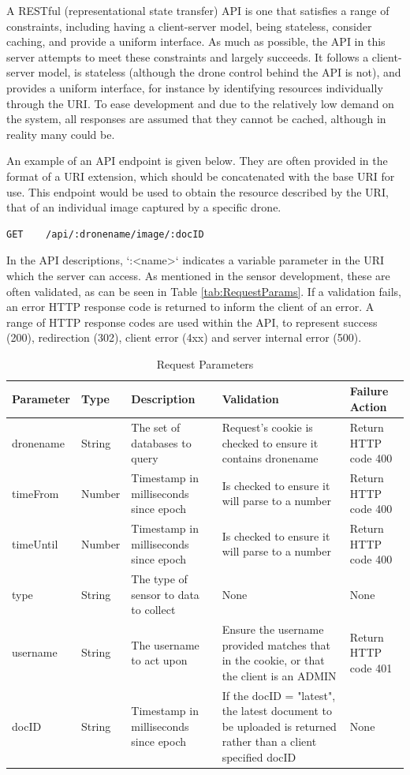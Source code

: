 \documentclass{article}
\begin{document}
A RESTful (representational state transfer) API is one that satisfies a range of constraints, including having a client-server model, being stateless, consider caching, and provide a uniform interface. As much as possible, the API in this server attempts to meet these constraints and largely succeeds. It follows a client-server model, is stateless (although the drone control behind the API is not), and provides a uniform interface, for instance by identifying resources individually through the URI. To ease development and due to the relatively low demand on the system, all responses are assumed that they cannot be cached, although in reality many could be. 

An example of an API endpoint is given below. They are often provided in the format of a URI extension, which should be concatenated with the base URI for use. This endpoint would be used to obtain the resource described by the URI, that of an individual image captured by a specific drone.
\begin{lstlisting}
GET    /api/:dronename/image/:docID
\end{lstlisting}
In the API descriptions, `:\textless name\textgreater` indicates a variable parameter in the URI which the server can access\cite{expressDocs}. As mentioned in the sensor development, these are often validated, as can be seen in Table \ref{tab:RequestParams}. If a validation fails, an error HTTP response code is returned to inform the client of an error. A range of HTTP response codes are used within the API, to represent success (200), redirection (302), client error (4xx) and server internal error (500).

\begin{table}[h]
\caption{Request Parameters\label{tab:RequestParams}}
\centering
\renewcommand{\arraystretch}{1.5}
\begin{tabularx}{\textwidth}{>{\centering}p{1.5cm} >{\centering}p{1cm} >{\centering}p{3cm} p{5cm} X}
Parameter & Type & Description & Validation & Failure Action \\ [0.5ex]
\hline
dronename & String & The set of databases to query & Request's cookie is checked to ensure it contains dronename & Return HTTP code 400 \\
timeFrom  & Number & Timestamp in milliseconds since epoch  & Is checked to ensure it will parse to a number & Return HTTP code 400 \\
timeUntil & Number & Timestamp in milliseconds since epoch  & Is checked to ensure it will parse to a number & Return HTTP code 400 \\
type      & String & The type of sensor to data to collect & None & None \\
username  & String & The username to act upon & Ensure the username provided matches that in the cookie, or that the client is an ADMIN & Return HTTP code 401 \\ 
docID 	  & String & Timestamp in milliseconds since epoch & If the docID = "latest", the latest document to be uploaded is returned rather than a client specified docID & None \\ [1ex]
\hline
\end{tabularx}
\label{table:requestParams}
\end{table}
\end{document}
